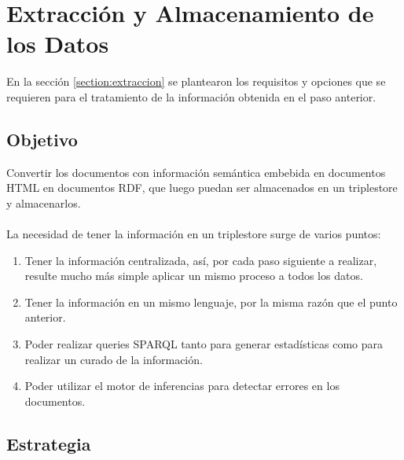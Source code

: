 \chapter{Extracción y Almacenamiento de los Datos}
\label{chapter:extraccion}

En la sección \ref{section:extraccion} se plantearon los requisitos y opciones que se requieren
para el tratamiento de la información obtenida en el paso anterior.

\section{Objetivo}

\noindent Convertir los documentos con información semántica embebida en documentos HTML en documentos RDF, que luego puedan ser 
almacenados en un triplestore y almacenarlos.
\\\\
La necesidad de tener la información en un triplestore surge de varios puntos:
\begin{enumerate}
 \item Tener la información centralizada, así, por cada paso siguiente a realizar, resulte mucho más simple aplicar un mismo proceso a todos los datos.
 \item Tener la información en un mismo lenguaje, por la misma razón que el punto anterior.
 \item Poder realizar queries SPARQL tanto para generar estadísticas como para realizar un curado de la información.
 \item Poder utilizar el motor de inferencias para detectar errores en los documentos.
\end{enumerate}

\section{Estrategia}

